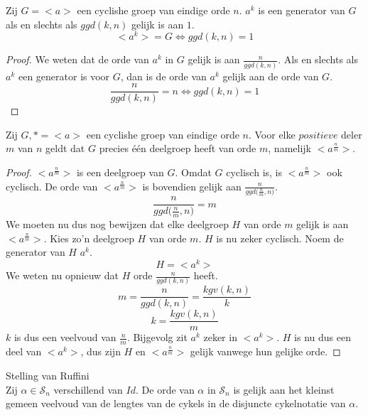 \documentclass[main.tex]{subfiles}
\begin{document}
\begin{st}
  Zij $G = <a>$ een cyclishe groep van eindige orde $n$.
  $a^{k}$ is een generator van $G$ als en slechts als $ggd(k,n)$ gelijk is aan $1$.
  \[ <a^{k}> = G \Leftrightarrow ggd(k,n) = 1 \]

  \begin{proof}
     We weten dat de orde van $a^{k}$ in $G$ gelijk is aan $\frac{n}{ggd(k,n)}$.
     Als en slechts als $a^{k}$ een generator is voor $G$, dan is de orde van $a^{k}$ gelijk aan de orde van $G$.
     \[ \frac{n}{ggd(k,n)} = n \Leftrightarrow ggd(k,n) = 1 \]
  \end{proof}
\end{st}

\begin{st}
  Zij $G,* = <a>$ een cyclishe groep van eindige orde $n$.
  Voor elke $positieve$ deler $m$ van $n$ geldt dat $G$ precies \'e\'en deelgroep heeft van orde $m$, namelijk $<a^{\frac{n}{m}}>$.
  \begin{proof}
    $<a^{\frac{n}{m}}>$ is een deelgroep van $G$.
    Omdat $G$ cyclisch is, is $<a^{\frac{n}{m}}>$ ook cyclisch. De orde van $<a^{\frac{n}{m}}>$ is bovendien gelijk aan $\frac{n}{ggd({\frac{n}{m},n)}}$.
    \[ \frac{n}{ggd({\frac{n}{m},n)}} = m \]
    We moeten nu dus nog bewijzen dat elke deelgroep $H$ van orde $m$ gelijk is aan $<a^{\frac{n}{m}}>$.
    Kies zo'n deelgroep $H$ van orde $m$. $H$ is nu zeker cyclisch.
    Noem de generator van $H$ $a^{k}$.
    \[ H = <a^{k}> \]
    We weten nu opnieuw dat $H$ orde $\frac{n}{ggd(k,n)}$ heeft.
    \[ m = \frac{n}{ggd(k,n)} = \frac{kgv(k,n)}{k} \]
    \[ k = \frac{kgv(k,n)}{m} \]
    $k$ is dus een veelvoud van $\frac{n}{m}$.
    Bijgevolg zit $a^{k}$ zeker in $<a^{k}>$.
    $H$ is nu dus een deel van $<a^{k}>$, dus zijn $H$ en $<a^{\frac{n}{m}}>$ gelijk vanwege hun gelijke orde.
  \end{proof}
\end{st}

\begin{st}
  \label{st:stelling-van-ruffini}
  Stelling van Ruffini\\
  Zij $\alpha\in \mathcal{S}_{n}$ verschillend van $Id$. De orde van $\alpha$ in $\mathcal{S}_{n}$ is gelijk aan het kleinst gemeen veelvoud van de lengtes van de cykels in de disjuncte cykelnotatie van $\alpha$.
\end{st}
\end{document}
